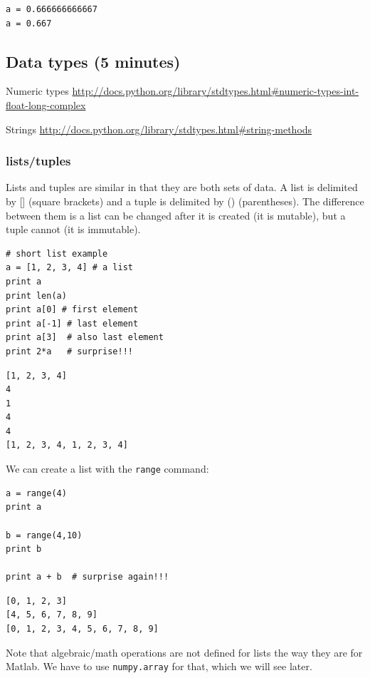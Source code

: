 \documentclass[11pt]{article}
\begin{document}
\begin{verbatim}
a = 0.666666666667
a = 0.667
\end{verbatim}


\subsection{Data types (5 minutes)}
\label{sec-3-3}
Numeric types \url{http://docs.python.org/library/stdtypes.html#numeric-types-int-float-long-complex}

Strings \url{http://docs.python.org/library/stdtypes.html#string-methods}


\subsubsection{lists/tuples}
\label{sec-3-3-1}

Lists and tuples are similar in that they are both sets of data. A list is delimited by [] (square brackets) and a tuple is delimited by () (parentheses). The difference between them is a list can be changed after it is created (it is mutable), but a tuple cannot (it is immutable).

\begin{verbatim}
# short list example
a = [1, 2, 3, 4] # a list
print a
print len(a)
print a[0] # first element
print a[-1] # last element
print a[3]  # also last element
print 2*a   # surprise!!!
\end{verbatim}

\begin{verbatim}
[1, 2, 3, 4]
4
1
4
4
[1, 2, 3, 4, 1, 2, 3, 4]
\end{verbatim}

We can create a list with the \texttt{range} command:

\begin{verbatim}
a = range(4)
print a

b = range(4,10)
print b

print a + b  # surprise again!!!
\end{verbatim}

\begin{verbatim}
[0, 1, 2, 3]
[4, 5, 6, 7, 8, 9]
[0, 1, 2, 3, 4, 5, 6, 7, 8, 9]
\end{verbatim}

Note that algebraic/math operations are not defined for lists the way they are for Matlab. We have to use \texttt{numpy.array} for that, which we will see later.
\end{document}
